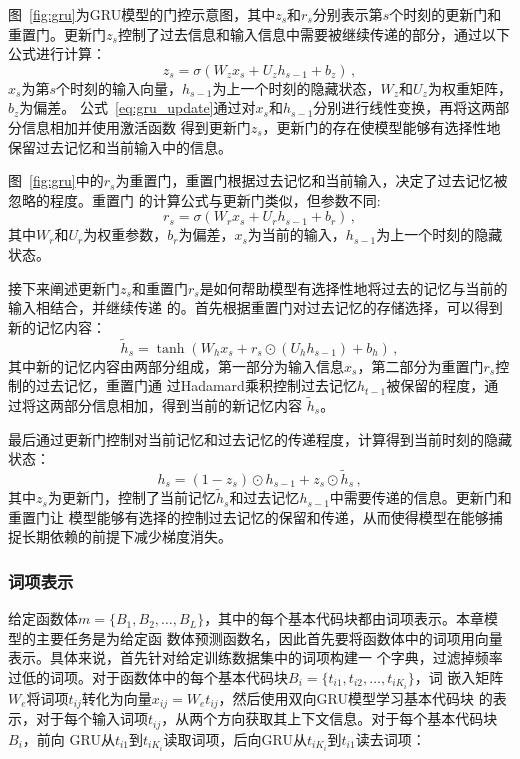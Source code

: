 图~\ref{fig:gru}为GRU模型的门控示意图，其中$z_s$和$r_s$分别表示第$s$个时刻的更新门和重置门。更新门$z_s$控制了过去信息和输入信息中需要被继续传递的部分，通过以下公式进行计算：
\begin{equation}
    z_s = \sigma (W_z x_s + U_z h_{s-1} + b_z) \,,
    \label{eq:gru_update}
\end{equation}
$x_s$为第$s$个时刻的输入向量，$h_{s-1}$为上一个时刻的隐藏状态，$W_z$和$U_z$为权重矩阵，$b_z$为偏差。
公式~\eqref{eq:gru_update}通过对$x_s$和$h_{s-1}$分别进行线性变换，再将这两部分信息相加并使用激活函数
得到更新门$z_s$，更新门的存在使模型能够有选择性地保留过去记忆和当前输入中的信息。

图~\ref{fig:gru}中的$r_s$为重置门，重置门根据过去记忆和当前输入，决定了过去记忆被忽略的程度。重置门
的计算公式与更新门类似，但参数不同:
\begin{equation}
    r_s = \sigma (W_r x_s + U_r h_{s-1} + b_r) \,,
    \label{eq:gru_ret}
\end{equation}
其中$W_r$和$U_r$为权重参数，$b_r$为偏差，$x_s$为当前的输入，$h_{s-1}$为上一个时刻的隐藏状态。

接下来阐述更新门$z_s$和重置门$r_s$是如何帮助模型有选择性地将过去的记忆与当前的输入相结合，并继续传递
的。首先根据重置门对过去记忆的存储选择，可以得到新的记忆内容：
\begin{equation}
    \tilde{h}_s = \tanh (W_h x_s + r_s \odot (U_h h_{s-1}) + b_h) \,,
    \label{eq:gru_cand}
\end{equation}
其中新的记忆内容由两部分组成，第一部分为输入信息$x_s$，第二部分为重置门$r_s$控制的过去记忆，重置门通
过Hadamard乘积控制过去记忆$h_{t-1}$被保留的程度，通过将这两部分信息相加，得到当前的新记忆内容
$\tilde{h}_s$。

最后通过更新门控制对当前记忆和过去记忆的传递程度，计算得到当前时刻的隐藏状态：
\begin{equation}
	h_s = (1-z_s) \odot h_{s-1} + z_s \odot \tilde{h}_s \,,
    \label{eq:gru_h}
\end{equation}
其中$z_s$为更新门，控制了当前记忆$\tilde{h}_s$和过去记忆$h_{s-1}$中需要传递的信息。更新门和重置门让
模型能够有选择的控制过去记忆的保留和传递，从而使得模型在能够捕捉长期依赖的前提下减少梯度消失。


\subsubsection{词项表示}
给定函数体$m=\{B_1,B_2,\dots,B_L\}$，其中的每个基本代码块都由词项表示。本章模型的主要任务是为给定函
数体预测函数名，因此首先要将函数体中的词项用向量表示。具体来说，首先针对给定训练数据集中的词项构建一
个字典，过滤掉频率过低的词项。对于函数体中的每个基本代码块$B_i=\{t_{i1},t_{i2},\dots,t_{iK_i}\}$，词
嵌入矩阵$W_e$将词项$t_{ij}$转化为向量$x_{ij}=W_e t_{ij}$，然后使用双向GRU模型学习基本代码块
的表示，对于每个输入词项$t_{ij}$，从两个方向获取其上下文信息。对于每个基本代码块$B_i$，前向
GRU从$t_{i1}$到$t_{iK_i}$读取词项，后向GRU从$t_{iK_i}$到$t_{i1}$读去词项：

